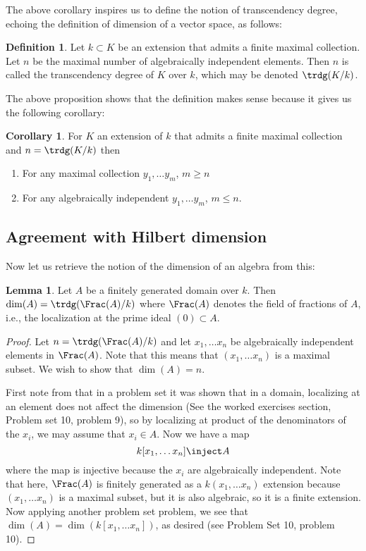\documentclass[12 pt]{article}
\theoremstyle{definition}
\newtheorem{cor}[thm]{Corollary}
\newtheorem{lemma}[thm]{Lemma}
\newtheorem{defn}[thm]{Definition}
\renewcommand{\(}{\left(}
\renewcommand{\)}{\right)}
\begin{document}
The above corollary inspires us to define the notion of transcendency degree, echoing the definition of dimension of a vector space, as follows:

\begin{defn} Let $k \subset K$ be an extension that admits a finite maximal collection. Let $n$ be the maximal number of algebraically independent elements. Then $n$ is called the transcendency degree of $K$ over $k$, which may be denoted $\trdg(K/k)$.
\end{defn}

The above proposition shows that the definition makes sense because it gives us the following corollary:

\begin{cor} For $K$ an extension of $k$ that admits a finite maximal collection and $n=\trdg(K/k)$ then
\begin{enumerate}
\item For any maximal collection $y_1, \ldots y_m$, $m \geq n$

\item For any algebraically independent $y_1, \ldots y_m$, $m \leq n$.
\end{enumerate}
\end{cor}

\subsection{Agreement with Hilbert dimension}

Now let us retrieve the notion of the dimension of an algebra from this:

\begin{lemma} Let $A$ be a finitely generated domain over $k$. Then $\dim(A)=\trdg(\Frac(A)/k)$ where $\Frac(A)$ denotes the field of fractions of $A$, i.e., the localization at the prime ideal $(0) \subset A$.
\end{lemma}
\begin{proof} Let $n =\trdg(\Frac(A)/k)$ and let $x_1, \ldots x_n$ be algebraically independent elements in $\Frac(A)$. Note that this means that $(x_1, \ldots x_n)$ is a maximal subset. We wish to show that $\dim(A)=n$.

First note from that in a problem set it was shown that in a domain, localizing at an element does not affect the dimension (See the worked exercises section, Problem set 10, problem 9), so by localizing at product of the denominators of the $x_i$, we may assume that $x_i \in A$. Now we have a map
\[k[x_1, \ldots x_n] \inject A\]
where the map is injective because the $x_i$ are algebraically independent. Note that here, $\Frac(A)$ is finitely generated as a $k(x_1, \ldots x_n)$ extension because $(x_1, \ldots x_n)$ is a maximal subset, but it is also algebraic, so it is a finite extension. Now applying another problem set problem, we see that $\dim(A)=\dim(k[x_1, \ldots x_n])$, as desired (see Problem Set 10, problem 10).
\end{proof}
\end{document}
